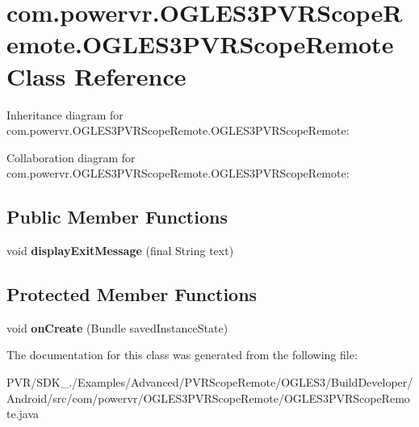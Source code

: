 \hypertarget{classcom_1_1powervr_1_1_o_g_l_e_s3_p_v_r_scope_remote_1_1_o_g_l_e_s3_p_v_r_scope_remote}{\section{com.\+powervr.\+O\+G\+L\+E\+S3\+P\+V\+R\+Scope\+Remote.\+O\+G\+L\+E\+S3\+P\+V\+R\+Scope\+Remote Class Reference}
\label{classcom_1_1powervr_1_1_o_g_l_e_s3_p_v_r_scope_remote_1_1_o_g_l_e_s3_p_v_r_scope_remote}
}


Inheritance diagram for com.\+powervr.\+O\+G\+L\+E\+S3\+P\+V\+R\+Scope\+Remote.\+O\+G\+L\+E\+S3\+P\+V\+R\+Scope\+Remote\+:


Collaboration diagram for com.\+powervr.\+O\+G\+L\+E\+S3\+P\+V\+R\+Scope\+Remote.\+O\+G\+L\+E\+S3\+P\+V\+R\+Scope\+Remote\+:
\subsection*{Public Member Functions}
\begin{DoxyCompactItemize}
\item 
\hypertarget{classcom_1_1powervr_1_1_o_g_l_e_s3_p_v_r_scope_remote_1_1_o_g_l_e_s3_p_v_r_scope_remote_a4aeaa53ea19e5beb8efdac159e1bee25}{void {\bfseries display\+Exit\+Message} (final String text)}\label{classcom_1_1powervr_1_1_o_g_l_e_s3_p_v_r_scope_remote_1_1_o_g_l_e_s3_p_v_r_scope_remote_a4aeaa53ea19e5beb8efdac159e1bee25}

\end{DoxyCompactItemize}
\subsection*{Protected Member Functions}
\begin{DoxyCompactItemize}
\item 
\hypertarget{classcom_1_1powervr_1_1_o_g_l_e_s3_p_v_r_scope_remote_1_1_o_g_l_e_s3_p_v_r_scope_remote_a0a0d4ab186fba76abc2cac91cdb943b6}{void {\bfseries on\+Create} (Bundle saved\+Instance\+State)}\label{classcom_1_1powervr_1_1_o_g_l_e_s3_p_v_r_scope_remote_1_1_o_g_l_e_s3_p_v_r_scope_remote_a0a0d4ab186fba76abc2cac91cdb943b6}

\end{DoxyCompactItemize}


The documentation for this class was generated from the following file\+:\begin{DoxyCompactItemize}
\item 
P\+V\+R/\+S\+D\+K\+\_./\+Examples/\+Advanced/\+P\+V\+R\+Scope\+Remote/\+O\+G\+L\+E\+S3/\+Build\+Developer/\+Android/src/com/powervr/\+O\+G\+L\+E\+S3\+P\+V\+R\+Scope\+Remote/O\+G\+L\+E\+S3\+P\+V\+R\+Scope\+Remote.\+java\end{DoxyCompactItemize}
